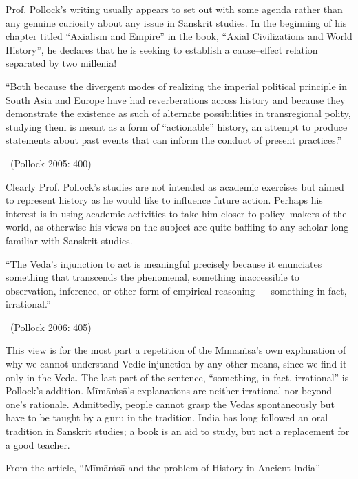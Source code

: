 Prof. Pollock’s writing usually appears to set out with some agenda rather than any genuine curiosity about any issue in Sanskrit studies. In the beginning of his chapter titled “Axialism and Empire” in the book, “Axial Civilizations and World History”, he declares that he is seeking to establish a cause–effect relation separated by two millenia!

\begin{myquote}
“Both because the divergent modes of realizing the imperial political principle in South Asia and Europe have had reverberations across history and because they demonstrate the existence as such of alternate possibilities in transregional polity, studying them is meant as a form of “actionable” history, an attempt to produce statements about past events that can inform the conduct of present practices.” 

~\hfill (Pollock 2005: 400)
\end{myquote}

Clearly Prof. Pollock’s studies are not intended as academic exercises but aimed to represent history as he would like to influence future action. Perhaps his interest is in using academic activities to take him closer to policy–makers of the world, as otherwise his views on the subject are quite baffling to any scholar long familiar with Sanskrit studies.

\begin{myquote}
“The Veda’s injunction to act is meaningful precisely because it enunciates something that transcends the phenomenal, something inaccessible to observation, inference, or other form of empirical reasoning –– something in fact, irrational.” 

~\hfill (Pollock 2006: 405)
\end{myquote}

This view is for the most part a repetition of the Mīmāṁsā’s own explanation of why we cannot understand Vedic injunction by any other means, since we find it only in the Veda. The last part of the sentence, “something, in fact, irrational” is Pollock’s addition. Mīmāṁsā’s explanations are neither irrational nor beyond one’s rationale. Admittedly, people cannot grasp the Vedas spontaneously but have to be taught by a guru in the tradition. India has long followed an oral tradition in Sanskrit studies; a book is an aid to study, but not a replacement for a good teacher. 

From the article, “Mīmāṁsā and the problem of History in Ancient India” –

